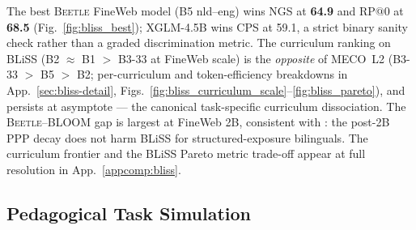\documentclass[11pt]{article}
\begin{document}
The best \textsc{Beetle} FineWeb model (B5 nld--eng) wins NGS at \textbf{64.9} and RP$@0$ at \textbf{68.5} (Fig.~\ref{fig:bliss_best}); XGLM-4.5B wins CPS at 59.1, a strict binary sanity check rather than a graded discrimination metric. The curriculum ranking on BLiSS (B2 $\approx$ B1 $>$ B3-33 at FineWeb scale) is the \emph{opposite} of MECO~L2 (B3-33 $>$ B5 $>$ B2; per-curriculum and token-efficiency breakdowns in App.~\ref{sec:bliss-detail}, Figs.~\ref{fig:bliss_curriculum_scale}--\ref{fig:bliss_pareto}), and persists at asymptote --- the canonical task-specific curriculum dissociation. The \textsc{Beetle}--BLOOM gap is largest at FineWeb 2B, consistent with \citet{aoyama-wilcox-2025-language}: the post-2B PPP decay does not harm BLiSS for structured-exposure bilinguals. The curriculum frontier and the BLiSS Pareto metric trade-off appear at full resolution in App.~\ref{appcomp:bliss}.


\subsection{Pedagogical Task Simulation}\label{sec:pedagogical}
\end{document}
